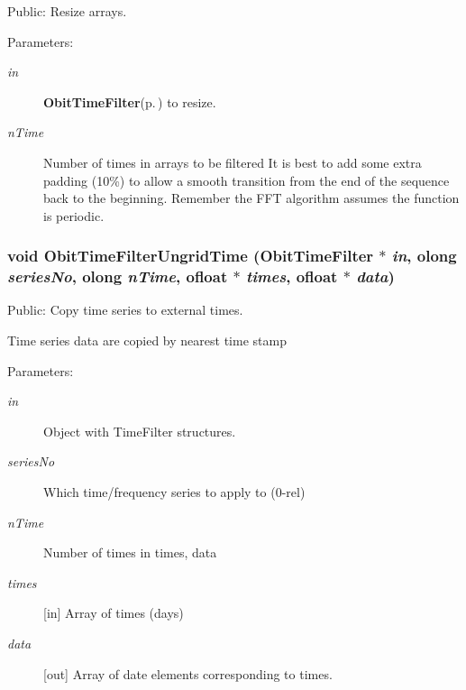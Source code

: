 Public: Resize arrays. 

\begin{Desc}
\item[Parameters:]
\begin{description}
\item[{\em in}]{\bf Obit\-Time\-Filter}{\rm (p.\,\pageref{structObitTimeFilter})} to resize. \item[{\em n\-Time}]Number of times in arrays to be filtered It is best to add some extra padding (10\%) to allow a smooth transition from the end of the sequence back to the beginning. Remember the FFT algorithm assumes the function is periodic. \end{description}
\end{Desc}
\subsubsection{\setlength{\rightskip}{0pt plus 5cm}void Obit\-Time\-Filter\-Ungrid\-Time ({\bf Obit\-Time\-Filter} $\ast$ {\em in}, {\bf olong} {\em series\-No}, {\bf olong} {\em n\-Time}, {\bf ofloat} $\ast$ {\em times}, {\bf ofloat} $\ast$ {\em data})}\label{ObitTimeFilter_8c_a11}


Public: Copy time series to external times. 

Time series data are copied by nearest time stamp \begin{Desc}
\item[Parameters:]
\begin{description}
\item[{\em in}]Object with Time\-Filter structures. \item[{\em series\-No}]Which time/frequency series to apply to (0-rel) \item[{\em n\-Time}]Number of times in times, data \item[{\em times}][in] Array of times (days) \item[{\em data}][out] Array of date elements corresponding to times. \end{description}
\end{Desc}

